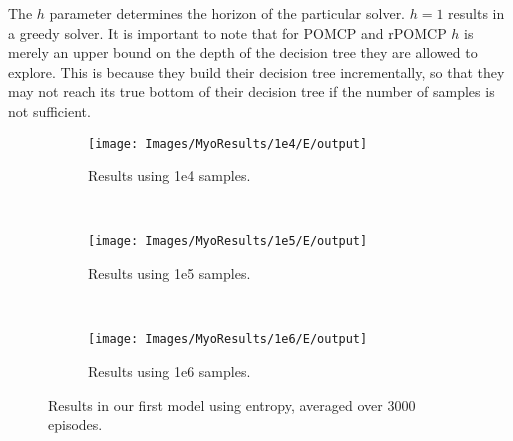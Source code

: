 The $h$ parameter determines the horizon of the particular solver. $h = 1$ results in a greedy
solver. It is important to note that for POMCP and rPOMCP $h$ is merely an upper bound on the depth
of the decision tree they are allowed to explore. This is because they build their decision tree
incrementally, so that they may not reach its true bottom of their decision tree if the number of
samples is not sufficient.

\begin{figure}[ht]
        \centering
        \begin{subfigure}[t]{0.3\textwidth}
                \texttt{[image: Images/MyoResults/1e4/E/output]}
                \caption{Results using 1e4 samples.}
                \label{fig:m4e}
        \end{subfigure}%
        ~ %
        \begin{subfigure}[t]{0.3\textwidth}
                \texttt{[image: Images/MyoResults/1e5/E/output]}
                \caption{Results using 1e5 samples.}
                \label{fig:m5e}
        \end{subfigure}
        ~ %
        \begin{subfigure}[t]{0.3\textwidth}
                \texttt{[image: Images/MyoResults/1e6/E/output]}
                \caption{Results using 1e6 samples.}
                \label{fig:m6e}
        \end{subfigure}
        \caption{Results in our first model using entropy, averaged over 3000 episodes.}
        \label{ref:myoentropyfig}
\end{figure}



